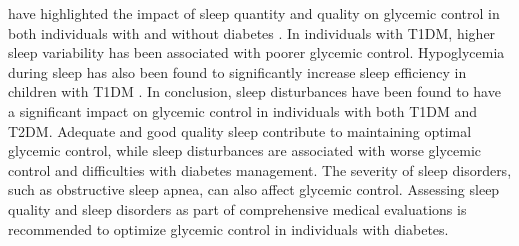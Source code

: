 have highlighted the impact of sleep quantity and quality on glycemic control in
both individuals with and without diabetes \parencite{smyth-2020}. In
individuals with T1DM, higher sleep variability has been associated with poorer
glycemic control. Hypoglycemia during sleep has also been found to significantly
increase sleep efficiency in children with T1DM \parencite{chontong-2016}.  In
conclusion, sleep disturbances have been found to have a significant impact on
glycemic control in individuals with both T1DM and T2DM. Adequate and good
quality sleep contribute to maintaining optimal glycemic control, while sleep
disturbances are associated with worse glycemic control and difficulties with
diabetes management. The severity of sleep disorders, such as obstructive sleep
apnea, can also affect glycemic control. Assessing sleep quality and sleep
disorders as part of comprehensive medical evaluations is recommended to
optimize glycemic control in individuals with diabetes.
